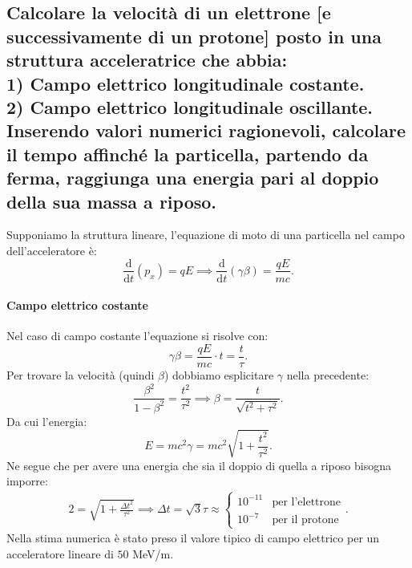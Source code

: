 \subsection[]{Calcolare la velocità di un elettrone [e successivamente di un protone] posto in una struttura acceleratrice che abbia: \\
	1) Campo elettrico longitudinale costante.\\ 
	2) Campo elettrico longitudinale oscillante.\\ 
Inserendo valori numerici ragionevoli, calcolare il tempo affinché la particella, partendo da ferma, raggiunga una energia pari al doppio della sua massa a riposo.}
\label{sec:3.b.19}
Supponiamo la struttura lineare, l'equazione di moto di una particella nel campo dell'acceleratore è:
\[
	\frac{\mbox{d} }{\mbox{d} t} \left( p_{x} \right) = qE \implies	\frac{\mbox{d} }{\mbox{d} t}\left( \gamma \beta \right)  = \frac{qE}{mc}
.\] 
\paragraph{Campo elettrico costante}%

Nel caso di campo costante l'equazione si risolve con:
\[
	\gamma \beta = \frac{qE}{mc}\cdot  t = \frac{t}{\tau}
.\] 
Per trovare la velocità (quindi $\beta$) dobbiamo esplicitare $\gamma$ nella precedente:
\[
	\frac{\beta^2}{1-\beta^2}= \frac{t^2}{\tau^2}\implies \beta=\frac{t}{\sqrt{t^2+\tau^2} }
.\] 
Da cui l'energia:
\[
	E= mc^2\gamma= mc^2\sqrt{1+\frac{t^2}{\tau^2}} 
.\] 
Ne segue che per avere una energia che sia il doppio di quella a riposo bisogna imporre:
\begin{align*}
	2=\sqrt{1+\frac{\Delta t^2}{\tau^2}} \implies \Delta t = \sqrt{3}\tau \approx 
	\begin{cases}
		10^{-11} & \text{per l'elettrone}\\
		10^{-7} &  \text{per il protone}
	\end{cases} 
.\end{align*}
Nella stima numerica è stato preso il valore tipico di campo elettrico per un acceleratore lineare di $50$ MeV/m.
